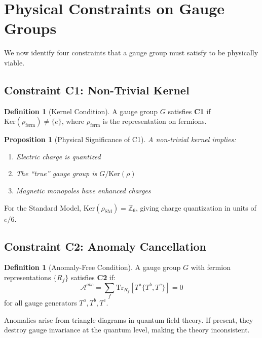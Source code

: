 \documentclass[11pt,a4paper,openright]{book}
\theoremstyle{plain}
\newtheorem{proposition}[theorem]{Proposition}
\theoremstyle{definition}
\newtheorem{definition}[theorem]{Definition}
\newcommand{\SM}{\mathrm{SM}}
\newcommand{\Ker}{\mathrm{Ker}}
\newcommand{\Tr}{\mathrm{Tr}}
\newcommand{\Z}{\mathbb{Z}}
\begin{document}
\section{Physical Constraints on Gauge Groups}

We now identify four constraints that a gauge group must satisfy to be physically viable.

\subsection{Constraint C1: Non-Trivial Kernel}

\begin{definition}[Kernel Condition]
A gauge group $G$ satisfies \textbf{C1} if $\Ker(\rho_{\mathrm{ferm}}) \neq \{e\}$, where $\rho_{\mathrm{ferm}}$ is the representation on fermions.
\end{definition}

\begin{proposition}[Physical Significance of C1]
A non-trivial kernel implies:
\begin{enumerate}
    \item Electric charge is quantized
    \item The ``true'' gauge group is $G/\Ker(\rho)$
    \item Magnetic monopoles have enhanced charges
\end{enumerate}
\end{proposition}

For the Standard Model, $\Ker(\rho_{\SM}) = \Z_6$, giving charge quantization in units of $e/6$.

\subsection{Constraint C2: Anomaly Cancellation}

\begin{definition}[Anomaly-Free Condition]
A gauge group $G$ with fermion representations $\{R_f\}$ satisfies \textbf{C2} if:
\begin{equation}
\mathcal{A}^{abc} = \sum_f \Tr_{R_f}[T^a \{T^b, T^c\}] = 0
\end{equation}
for all gauge generators $T^a, T^b, T^c$.
\end{definition}

Anomalies arise from triangle diagrams in quantum field theory. If present, they destroy gauge invariance at the quantum level, making the theory inconsistent.
\end{document}
